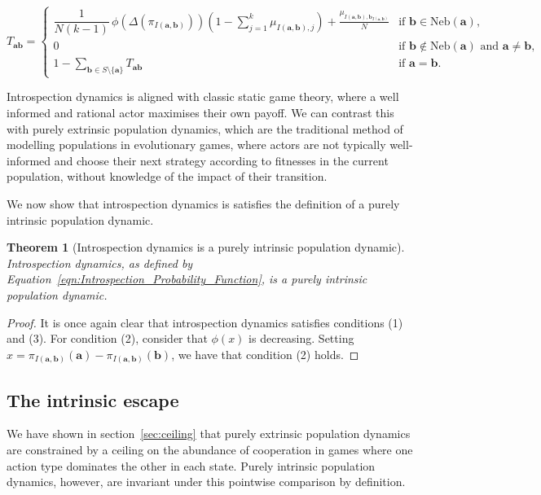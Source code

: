 \documentclass{article}
\newtheorem{theorem}{Theorem}
\begin{document}
\begin{equation}
T_{\mathbf{ab}} =
\begin{cases}
\dfrac{1}{N(k - 1)} \, \phi (\Delta (\pi_{I(\mathbf{a}, \mathbf{b})}))\left(1 - \sum_{j=1}^k \mu_{I(\mathbf{a}, \mathbf{b}), j}\right)+ \frac{\mu_{I(\mathbf{a}, \mathbf{b}), \mathbf{b}_{I(\mathbf{a}, \mathbf{b})}}}{N}
    & \text{if } \mathbf{b} \in \mathrm{Neb}(\mathbf{a}),\\[1.2em]
0
    & \text{if } \mathbf{b} \notin \mathrm{Neb}(\mathbf{a}) \text{ and } \mathbf{a} \neq \mathbf{b},\\[0.8em]
1 - \sum_{\mathbf{b} \in S \setminus \{\mathbf{a}\}} T_{\mathbf{ab}} & \text{if } \mathbf{a} = \mathbf{b}.
\end{cases}
\label{eqn:Introspection_Probability_Function}
\end{equation}

Introspection dynamics is aligned with classic static game theory, where a well
informed and rational actor maximises their own payoff. We can contrast this
with purely extrinsic population dynamics, which are the traditional method of
modelling populations in evolutionary games, where actors are not typically
well-informed and choose their next strategy according to fitnesses in the
current population, without knowledge of the impact of their transition.

We now show that introspection dynamics is satisfies the definition of a purely
intrinsic population dynamic.

\begin{theorem}[Introspection dynamics is a purely intrinsic population dynamic]
    Introspection dynamics, as defined by
    Equation~\eqref{eqn:Introspection_Probability_Function}, is a purely
    intrinsic population dynamic.
\end{theorem}
\begin{proof}
    It is once again clear that introspection dynamics satisfies conditions (1)
    and (3). For condition (2), consider that \(\phi(x)\) is decreasing. Setting
    \(x = \pi_{I(\mathbf{a,b})}(\mathbf{a})-
    \pi_{I(\mathbf{a,b})}(\mathbf{b})\), we have that condition (2) holds.
\end{proof}

\subsection{The intrinsic escape}

We have shown in section~\ref{sec:ceiling} that purely extrinsic population
dynamics are constrained by a ceiling on the abundance of cooperation in games
where one action type dominates the other in each state. Purely intrinsic
population dynamics, however, are invariant under this pointwise comparison by
definition.
\end{document}
